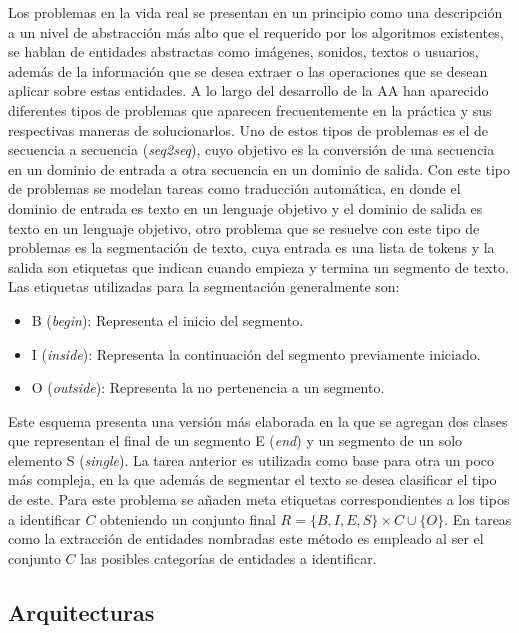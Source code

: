 Los problemas en la vida real se presentan en un principio como una descripción a un nivel de abstracción 
más alto que el requerido por los algoritmos existentes, se hablan de entidades abstractas como imágenes,
sonidos, textos o usuarios, además de la información que se desea extraer o las operaciones que se
desean aplicar sobre estas entidades. A lo largo del desarrollo de la AA han aparecido diferentes tipos de problemas 
que aparecen frecuentemente en la práctica y sus respectivas maneras de solucionarlos. Uno de estos tipos de problemas
es el de secuencia a secuencia (\emph{seq2seq}), cuyo objetivo es la conversión de una secuencia en un dominio de entrada a otra 
secuencia en un dominio de salida. Con este tipo de problemas se modelan tareas como traducción automática, en 
donde el dominio de entrada es texto en un lenguaje objetivo y el dominio de salida es texto en un lenguaje objetivo,
otro problema que se resuelve con este tipo de problemas es la segmentación de texto, cuya entrada es una lista de tokens
y la salida son etiquetas que indican cuando empieza y termina un segmento de texto. Las etiquetas utilizadas para 
la segmentación generalmente son:

\begin{itemize}
	\item B (\emph{begin}): Representa el inicio del segmento.
	\item I (\emph{inside}): Representa la continuación del segmento previamente iniciado.
	\item O (\emph{outside}): Representa la no pertenencia a un segmento.
\end{itemize}

Este esquema presenta una versión más elaborada en la que se agregan dos clases que representan el final 
de un segmento E (\emph{end}) y un segmento de un solo elemento S (\emph{single}). La tarea anterior es 
utilizada como base para otra un poco más compleja, en la que además de segmentar el texto se desea clasificar 
el tipo de este. Para este problema se añaden meta etiquetas correspondientes a los tipos a identificar $C$ 
obteniendo un conjunto final $R = \{ B, I, E, S \} \times C \cup \{ O \}$. En tareas como la extracción de entidades
nombradas este método es empleado al ser el conjunto $C$ las posibles categorías de entidades a identificar.

\subsection{Arquitecturas}

